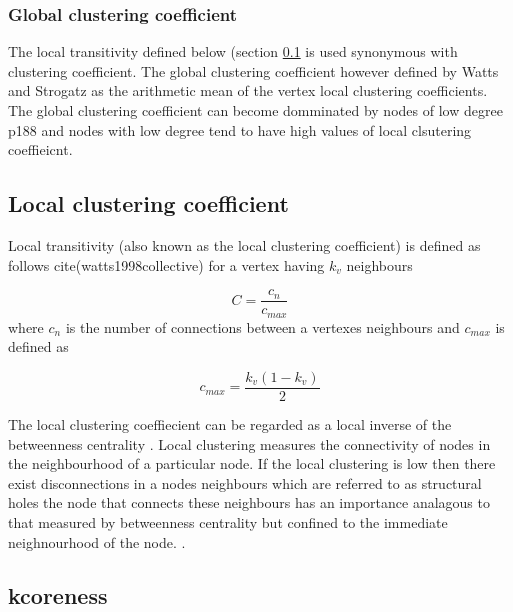 

\subsubsection{Global clustering coefficient}
\label{sec:Global clustering coefficient}
The local transitivity defined below (section \ref{sec:local clustering coefficient} is used synonymous with clustering coefficient. The global clustering coefficient however defined by Watts and Strogatz as the arithmetic mean of the vertex local clustering coefficients. The global clustering coefficient can become domminated by nodes of low degree \cite{newman2018networks} p188 and nodes with low degree tend to have high values of local clsutering coeffieicnt. 

\subsection{Local clustering coefficient}
\label{sec:local clustering coefficient}
Local transitivity (also known as the local clustering coefficient) is defined as  follows cite(watts1998collective) for a vertex having $k_v$ neighbours 

\begin{equation}
C = \frac{c_n}{c_{max}}
\end{equation}
where $c_n$ is the number of connections between a vertexes neighbours and $c_{max}$ is defined as 

\begin{equation}
c_{max} = \frac{k_v(1-k_v)}{2}
\end{equation}

The local clustering coeffiecient can be regarded as a local inverse of the betweenness centrality . Local clustering measures the connectivity of nodes in the neighbourhood of a particular node. If the local clustering is low then there exist disconnections in a nodes neighbours which are referred to as structural holes  the node that connects these neighbours has an importance analagous to that measured by betweenness centrality but confined to the immediate neighnourhood of the node. .






\subsection{kcoreness}

